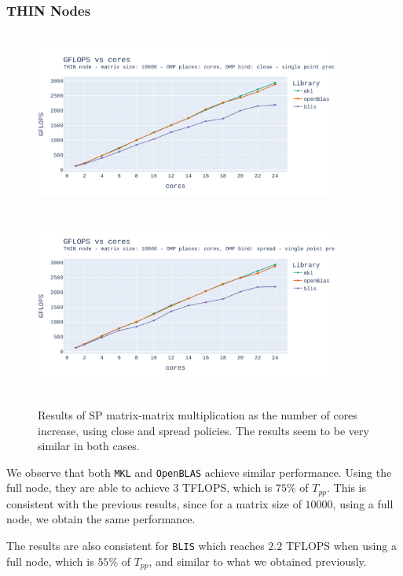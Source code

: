 \documentclass{report}
\begin{document}
\subsubsection{THIN Nodes}
\begin{figure}[h!]
\hspace*{-2.5cm}
\includegraphics[width=10cm, height=6cm]{./images/fixed_size_thin_float_gflops_close.pdf}
\includegraphics[width=10cm, height=6cm]{./images/fixed_size_thin_float_gflops_spread.pdf}
\caption{\label{fig:fixed_size_thin_float} Results of SP matrix-matrix multiplication 
as the number of cores increase, using close and spread policies. The results 
seem to be very similar in both cases.}
\end{figure}

We observe that both \texttt{MKL} and \texttt{OpenBLAS} achieve similar 
performance. Using the full node, they are able to achieve $3$ TFLOPS, which is 
$75\%$ of $T_{pp}$. This is consistent with the previous results, since for a 
matrix size of $10000$, using a full node, we obtain the same performance. 

The results are also consistent for \texttt{BLIS} which reaches $2.2$ TFLOPS 
when using a full node, which is $55\%$ of $T_{pp}$, and similar to what we 
obtained previously.

 
\end{document}
